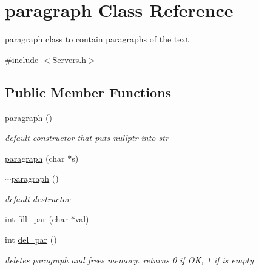 \hypertarget{classparagraph}{}\section{paragraph Class Reference}
\label{classparagraph}


paragraph class to contain paragraphs of the text  




{\ttfamily \#include $<$Servers.\+h$>$}

\subsection*{Public Member Functions}
\begin{DoxyCompactItemize}
\item 
\mbox{\label{classparagraph_abe782a42e4f7356e86f1a801de47885b}} 
\hyperlink{classparagraph_abe782a42e4f7356e86f1a801de47885b}{paragraph} ()
\begin{DoxyCompactList}\small\item\em default constructor that puts nullptr into str \end{DoxyCompactList}\item 
\hyperlink{classparagraph_a7dafd3517c2c11bf597b54eace6ae92c}{paragraph} (char $\ast$s)
\item 
\mbox{\label{classparagraph_a6c1a6d5356e7578782b9f7874065ff5a}} 
\hyperlink{classparagraph_a6c1a6d5356e7578782b9f7874065ff5a}{$\sim$paragraph} ()
\begin{DoxyCompactList}\small\item\em default destructor \end{DoxyCompactList}\item 
int \hyperlink{classparagraph_a3be51295931921fa55765033675e45dd}{fill\+\_\+par} (char $\ast$val)
\item 
\mbox{\label{classparagraph_a0ee3f2994f36b646cb3761f572b30c86}} 
int \hyperlink{classparagraph_a0ee3f2994f36b646cb3761f572b30c86}{del\+\_\+par} ()
\begin{DoxyCompactList}\small\item\em deletes paragraph and frees memory. returns 0 if OK, 1 if is empty \end{DoxyCompactList}\item 
\mbox{\label{classparagraph_a62943695dffea8c5bde766d1655306d9}} 

\end{DoxyCompactItemize}

